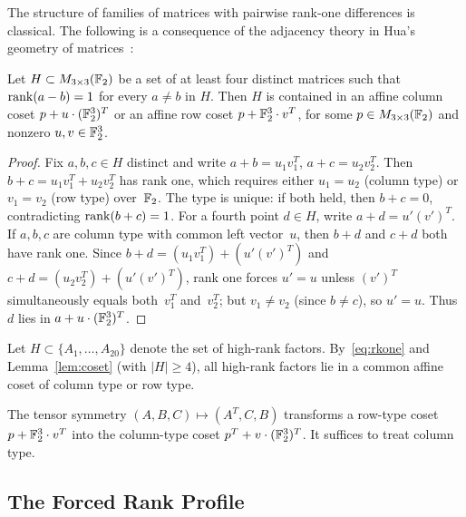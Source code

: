\documentclass[11pt,a4paper]{article}
\begin{document}
The structure of families of matrices with pairwise rank-one differences is classical.  The following is a consequence of the adjacency theory in Hua's geometry of matrices~\cite{hua1945geometries,wan1996geometry,pazzis2015hua}:

\begin{lemma}\label{lem:coset}
  Let $H\subset M_{3\times 3}(\mathbb{F}_2)$ be a set of at least four distinct matrices such that $\operatorname{rank}(a-b)=1$ for every $a\ne b$ in $H$.  Then $H$ is contained in an affine column coset $p+u\cdot(\mathbb{F}_2^3)^T$ or an affine row coset $p+\mathbb{F}_2^3\cdot v^T$, for some $p\in M_{3\times 3}(\mathbb{F}_2)$ and nonzero $u,v\in\mathbb{F}_2^3$.
\end{lemma}

\begin{proof}
  Fix $a,b,c\in H$ distinct and write $a+b=u_1v_1^T$, $a+c=u_2v_2^T$.  Then $b+c=u_1v_1^T+u_2v_2^T$ has rank one, which requires either $u_1=u_2$ (column type) or $v_1=v_2$ (row type) over~$\mathbb{F}_2$.  The type is unique: if both held, then $b+c=0$, contradicting $\operatorname{rank}(b+c)=1$.  For a fourth point $d\in H$, write $a+d=u'(v')^T$.  If $a,b,c$ are column type with common left vector~$u$, then $b+d$ and $c+d$ both have rank one.  Since $b+d=(u_1v_1^T)+(u'(v')^T)$ and $c+d=(u_2v_2^T)+(u'(v')^T)$, rank one forces $u'=u$ unless $(v')^T$ simultaneously equals both~$v_1^T$ and~$v_2^T$; but $v_1\ne v_2$ (since $b\ne c$), so $u'=u$.  Thus $d$ lies in $a+u\cdot(\mathbb{F}_2^3)^T$.
\end{proof}

Let $H\subset\{A_1,\ldots,A_{20}\}$ denote the set of high-rank factors.  By~\eqref{eq:rkone} and Lemma~\ref{lem:coset} (with $|H|\ge 4$), all high-rank factors lie in a common affine coset of column type or row type.

The tensor symmetry $(A,B,C)\mapsto(A^T,C,B)$ transforms a row-type coset $p+\mathbb{F}_2^3\cdot v^T$ into the column-type coset $p^T+v\cdot(\mathbb{F}_2^3)^T$.  It suffices to treat column type.

\subsection{The Forced Rank Profile}
\end{document}
